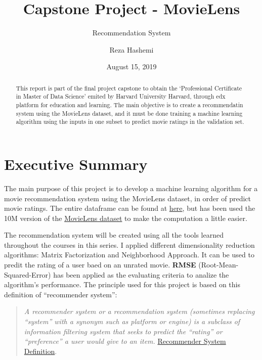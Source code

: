 \documentclass[]{article}
\title{Capstone Project - MovieLens}
\subtitle{Recommendation System}
\author{Reza Hashemi}
\date{August 15, 2019}
\begin{document}
\maketitle
\begin{abstract}
This report is part of the final project capstone to obtain the
`Professional Certificate in Master of Data Science' emited by Harvard
University Harvard, through edx platform for education and learning. The
main objective is to create a recommendatin system using the MovieLens
dataset, and it must be done training a machine learning algorithm using
the inputs in one subset to predict movie ratings in the validation set.
\end{abstract}

{
\setcounter{tocdepth}{3}
\tableofcontents
}
\pagebreak

\hypertarget{executive-summary}{%
\section{Executive Summary}\label{executive-summary}}

The main purpose of this project is to develop a machine learning
algorithm for a movie recommendation system using the MovieLens dataset,
in order of predict movie ratings. The entire dataframe can be found at
\href{https://grouplens.org/datasets/movielens/latest/}{here}, but has
been used the 10M version of the
\href{http://grouplens.org/datasets/movielens/10m/}{MovieLens dataset}
to make the computation a little easier.

The recommendation system will be created using all the tools learned
throughout the courses in this series. I applied different
dimensionality reduction algorithms: Matrix Factorization and
Neighborhood Approach. It can be used to predit the rating of a user
baed on an unrated movie. \textbf{RMSE} (Root-Mean-Squared-Error) has
been applied as the evaluating criteria to analize the algorithm's
performance. The principle used for this project is based on this
definition of ``recommender system'':

\begin{quote}
\emph{A recommender system or a recommendation system (sometimes
replacing ``system'' with a synonym such as platform or engine) is a
subclass of information filtering system that seeks to predict the
``rating'' or ``preference'' a user would give to an item.}
\href{https://en.wikipedia.org/wiki/Recommender_system}{Recommender
System Definition}.
\end{quote}
\end{document}
